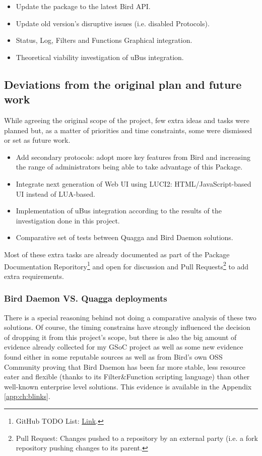 \begin{itemize}
    \item Update the package to the latest Bird API.
    \item Update old version's disruptive issues (i.e. disabled Protocols).
    \item Status, Log, Filters and Functions Graphical integration.
    \item Theoretical viability investigation of uBus integration.
\end{itemize}


\subsection{Deviations from the original plan and future  work}
While agreeing the original scope of the project, few extra ideas and tasks were planned but, as a matter of priorities and time constraints, some were dismissed or set as future work.

\begin{itemize}
    \item Add secondary protocols: adopt more key features from Bird and increasing the range of administrators being able to take advantage of this Package.
    \item Integrate next generation of Web UI using LUCI2: HTML/JavaScript-based UI instead of LUA-based.
    \item Implementation of uBus integration according to the results of the investigation done in this project.
    \item Comparative set of tests between Quagga and Bird Daemon solutions.
\end{itemize}

Most of these extra tasks are already documented as part of the Package Documentation Reporitory\footnote{GitHub TODO List: \href{https://github.com/eloicaso/bgp-bmx6-bird-docn/blob/master/EN/TODO.md}{Link}.} and open for discussion and Pull Requests\footnote{Pull Request: Changes pushed to a repository by an external party (i.e. a fork repository pushing changes to its parent.} to add extra requirements.

\subsubsection{Bird Daemon VS. Quagga deployments}
There is a special reasoning behind not doing a comparative analysis of these two solutions. Of course, the timing constrains have strongly influenced the decision of dropping it from this project's scope, but there is also the big amount of evidence already collected for my GSoC project as well as some new evidence found either in some reputable sources as well as from Bird's own OSS Community proving that Bird Daemon has been far more stable, less resource eater and flexible (thanks to its Filter\&Function scripting language) than other well-known enterprise level solutions. This evidence is available in the Appendix \ref{app:ch:blinks}.


